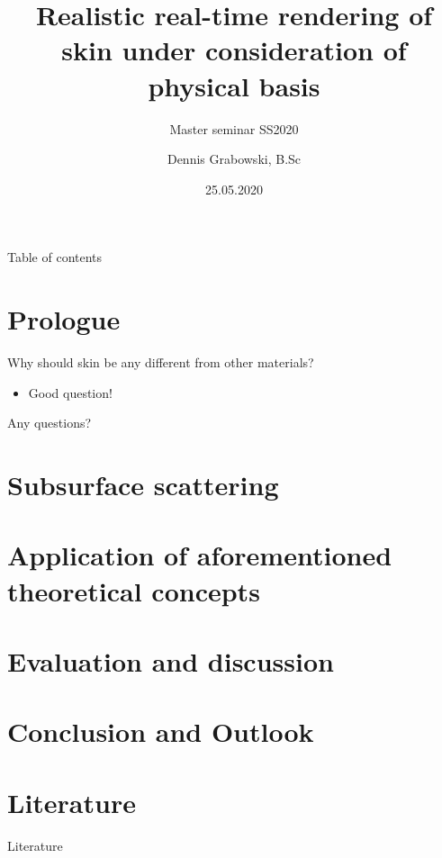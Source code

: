 \documentclass{f4_beamer_metropolis}
\title{Realistic real-time rendering of skin under consideration of physical basis}
\subtitle{Master seminar SS2020}
\author{Dennis Grabowski, B.Sc}
\date{25.05.2020}
\begin{document}
\begin{frame}{Table of contents}
    \tableofcontents[hideallsubsections]
  \end{frame}

\section{Prologue}
\label{sec:intro}

\begin{frame}{Why should skin be any different from other materials?}
  \begin{itemize}
    \item Good question!
  \end{itemize}

\end{frame}

\begin{frame}[standout]
  Any questions?
\end{frame}

\section{Subsurface scattering}
\label{sec:subsurface}

\section{Application of aforementioned theoretical concepts}
\label{sec:application}

\section{Evaluation and discussion}
\label{sec:evalanddiscuss}

\section{Conclusion and Outlook}
\label{sec:outlook}

\section{Literature}

\begin{frame}[allowframebreaks]{Literature}
  \printbibliography
\end{frame}
\end{document}
